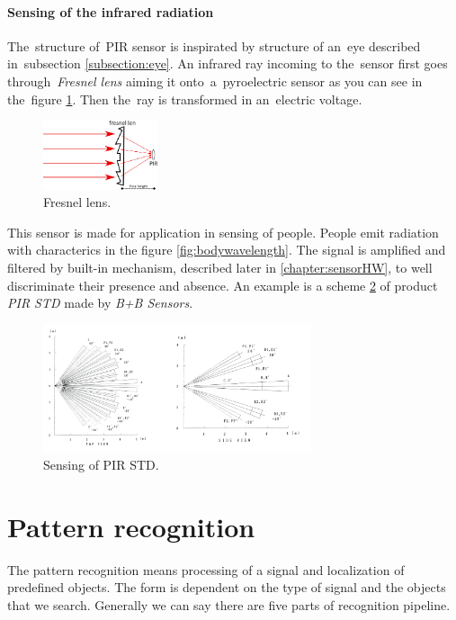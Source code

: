 \paragraph{Sensing of the infrared radiation}
The~structure of~PIR sensor is inspirated by structure of an~eye described in~subsection \ref{subsection:eye}.
An infrared ray incoming to the~sensor first goes through~{\it Fresnel lens} aiming it onto~a~pyroelectric sensor
as you can see in the~figure \ref{fig:fresnellens}. Then the~ray is transformed in an~electric voltage.

\begin{figure}[h!]
\begin{center}
\includegraphics[width=0.3\textwidth]{img/fresnellens.png}
\caption{Fresnel lens.\label{fig:fresnellens}}
\end{center}
\end{figure}

This sensor is made for application in sensing of people. People emit radiation with characterics
in the figure \ref{fig:bodywavelength}. The signal is amplified and filtered by built-in mechanism,
described later in \ref{chapter:sensorHW}, to well discriminate their presence and absence.
An example is a scheme \ref{fig:roomsegments} of product {\it PIR STD} made by {\it B+B Sensors}.

\begin{figure}[h!]
\begin{center}
\includegraphics[width=0.7\textwidth]{img/roomsegments.png}
\caption{Sensing of PIR STD. \cite{PIROperationalManual}\label{fig:roomsegments}}
\end{center}    
\end{figure}



\newpage
\section{Pattern recognition}
The pattern recognition means processing of a signal and localization of predefined objects.
The form is dependent on the type of signal and the objects that we search. Generally we can say
there are five parts of recognition pipeline.

